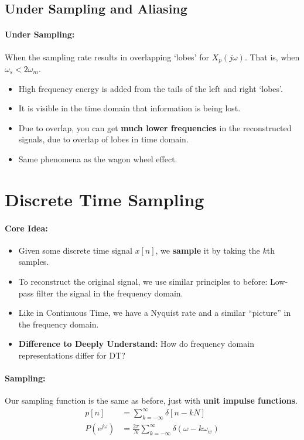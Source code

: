 \documentclass[a4paper,12pt]{report}
\begin{document}
\subsection{Under Sampling and Aliasing}

\paragraph{Under Sampling: } When the sampling rate results in overlapping `lobes' for $X_p(j\omega)$. That is, when $\omega_s < 2\omega_m$.
\begin{itemize}
\item High frequency energy is added from the tails of the left and right `lobes'. 
\item It is visible in the time domain that information is being lost.
\item Due to overlap, you can get \textbf{much lower frequencies} in the reconstructed signals, due to overlap of lobes in time domain. 
\item Same phenomena as the wagon wheel effect.
\end{itemize}

\section{Discrete Time Sampling}

\paragraph{Core Idea: } 
\begin{itemize}
\item Given some discrete time signal $x[n]$, we \textbf{sample} it by taking the $k$th samples. 
\item To reconstruct the original signal, we use similar principles to before: Low-pass filter the signal in the frequency domain. 
\item Like in Continuous Time, we have a Nyquist rate and a similar ``picture'' in the frequency domain. 
\item \textbf{Difference to Deeply Understand: } How do frequency domain representations differ for DT?
\end{itemize}

\paragraph{Sampling: } Our sampling function is the same as before, just with \textbf{unit impulse functions}. 
\begin{align}
p[n] &= \sum_{k=-\infty}^{\infty} \delta[n-kN] \\ 
P(e^{j\omega}) &= \frac{2\pi}{N} \sum_{k=-\infty}^{\infty} \delta(\omega-k\omega_w) \\
\end{align}
\end{document}
